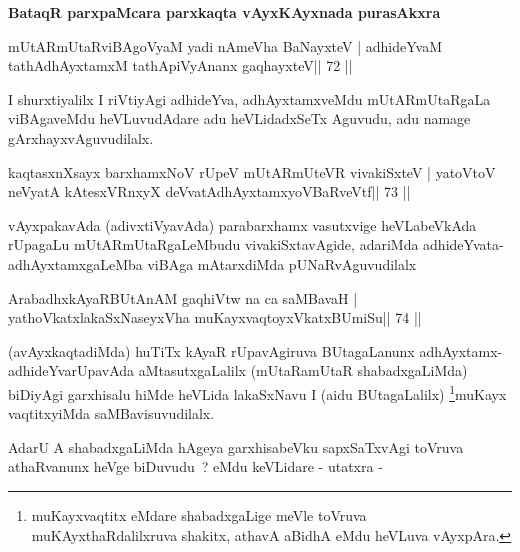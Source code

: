 \begin{center}
\textbf{BataqR parxpaMcara parxkaqta vAyxKAyxnada purasAkxra}
\end{center}



\begin{shl}
mUtARmUtaRviBAgoV\s yaM yadi nAmeVha BaNayxteV |
adhideYvaM tathA\s dhAyxtamxM tathA\s piVyAnanx gaqhayxteV\hfill || 72 ||
\end{shl}

\begin{artha}
I shurxtiyalilx I riVtiyAgi adhideYva, adhAyxtamxveMdu mUtARmUtaRgaLa viBAgaveMdu heVLuvudAdare adu heVLidadxSeTx Aguvudu, adu namage gArxhayxvAguvudilalx.
\end{artha}



\begin{shl}
kaqtasxnXsayx barxhamxNoV rUpeV mUtARmUteVR vivakiSxteV |
yatoV\s toV neVyatA kAtesxVRnxyX deVvatAdhAyxtamxyoVBaRveVtf\hfill || 73 ||
\end{shl}

\begin{artha}
vAyxpakavAda (adivxtiVyavAda) parabarxhamx vasutxvige heVLabeVkAda
rUpagaLu mUtARmUtaRgaLeMbudu vivakiSxtavAgide, adariMda
adhideYvata-adhAyxtamxgaLeMba viBAga mAtarxdiMda pUNaRvAguvudilalx
\end{artha}

\begin{shl}
ArabadhxkAyaRBUtAnAM gaqhiVtw na ca saMBavaH |
yathoVkatxlakaSxNaseyxVha muKayxvaqtoyxVkatxBUmiSu\hfill || 74 ||
\end{shl}

\begin{artha}
(avAyxkaqtadiMda) huTiTx kAyaR rUpavAgiruva BUtagaLanunx adhAyxtamx-adhi\-deYvarUpavAda aMtasutxgaLalilx (mUtaRamUtaR shabadxgaLiMda) biDiyAgi garxhisalu hiMde heVLida lakaSxNavu I (aidu BUtagaLalilx) \footnote{muKayxvaqtitx eMdare shabadxgaLige meVle toVruva muKAyxthaRdalilxruva shakitx, athavA aBidhA eMdu heVLuva vAyxpAra.}muKayx vaqtitxyiMda saMBavisuvudilalx.
\end{artha}

\begin{artha}
AdarU A shabadxgaLiMda hAgeya garxhisabeVku sapxSaTxvAgi toVruva
athaRvanunx heVge biDuvudu~? eMdu keVLidare - utatxra -
\end{artha}

